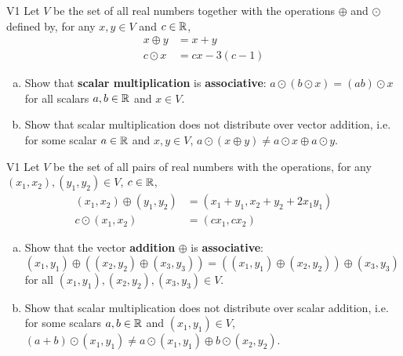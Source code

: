 \begin{problem}{V1}
Let \(V\) be the  set of all real numbers together with the operations \(\oplus\) and \(\odot\) defined by, for any \(x,y\in V\) and \(c\in \mathbb{R}\),
\begin{align*}
x\oplus y  &= x+y \\
c \odot x &= cx-3(c-1)
\end{align*}
\begin{enumerate}[(a)]
\item Show that \textbf{scalar multiplication} is
      \textbf{associative}: \(a\odot(b\odot x)=(ab)\odot x\) for all scalars \(a,b \in \mathbb{R}\) and \(x \in V\).
\item Show that scalar multiplication does not distribute over vector addition, i.e. for some scalar \(a \in \mathbb{R}\) and \(x,y\in V\), \(a \odot (x \oplus y) \neq a \odot x \oplus a \odot y\).
\end{enumerate}
\end{problem}


\begin{problem}{V1}
Let \(V\) be the set of all pairs of real numbers with the operations, for any \((x_1,x_2), (y_1,y_2) \in V\), \(c\in \mathbb{R}\),
\begin{align*}
(x_1,x_2) \oplus (y_1,y_2) &= (x_1+y_1,x_2+y_2+2x_1y_1) \\
c \odot (x_1,x_2) &= (cx_1, cx_2)
\end{align*}
\begin{enumerate}[(a)]
\item Show that the vector \textbf{addition} \(\oplus\) is \textbf{associative}:
      \((x_1,y_1) \oplus ((x_2,y_2) \oplus (x_3,y_3))=((x_1,y_1)\oplus (x_2,y_2))\oplus (x_3,y_3)\) for all \((x_1,y_1), (x_2,y_2), (x_3,y_3) \in V\).
\item Show that scalar multiplication does not distribute over scalar addition, i.e. for some scalars \(a,b \in \mathbb{R}\) and \((x_1,y_1) \in V\), \( (a+b) \odot (x_1,y_1) \neq a\odot (x_1,y_1) \oplus b \odot (x_2,y_2) \).
\end{enumerate}
\end{problem}




